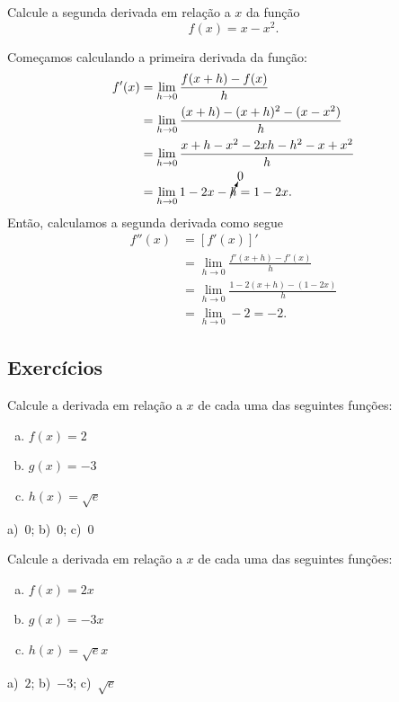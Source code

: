 \begin{exeresol}
  Calcule a segunda derivada em relação a $x$ da função
  \begin{equation}
    f(x) = x - x^2.
  \end{equation}
\end{exeresol}
\begin{resol}
  Começamos calculando a primeira derivada da função:
  \begin{align}
    f'(x) &= \lim_{h\to 0} \frac{f(x+h)-f(x)}{h} \\
          &= \lim_{h\to 0} \frac{(x+h)-(x+h)^2-(x-x^2)}{h} \\
          &= \lim_{h\to 0} \frac{x+h-x^2-2xh-h^2-x+x^2}{h} \\
          &= \lim_{h\to 0} 1-2x-\cancelto{0}{h} = 1 - 2x.
  \end{align}
  Então, calculamos a segunda derivada como segue
  \begin{align}
    f''(x) &= [f'(x)]' \\
           &= \lim_{h\to 0} \frac{f'(x+h)-f'(x)}{h} \\
           &= \lim_{h\to 0} \frac{1-2(x+h)-(1-2x)}{h} \\
           &= \lim_{h\to 0} -2 = -2.
  \end{align}
\end{resol}

\subsection*{Exercícios}

\begin{exer}
  Calcule a derivada em relação a $x$ de cada uma das seguintes funções:
  \begin{enumerate}[a)]
  \item $f(x) = 2$
  \item $g(x) = -3$
  \item $h(x) = \sqrt{e}$
  \end{enumerate}
\end{exer}
\begin{resp}
  a)~$0$; b)~$0$; c)~$0$
\end{resp}

\begin{exer}
  Calcule a derivada em relação a $x$ de cada uma das seguintes funções:
  \begin{enumerate}[a)]
  \item $f(x) = 2x$
  \item $g(x) = -3x$
  \item $h(x) = \sqrt{e}x$
  \end{enumerate}
\end{exer}
\begin{resp}
  a)~$2$; b)~$-3$; c)~$\sqrt{e}$
\end{resp}

